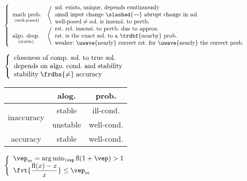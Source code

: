 $
	\left\{
	\begin{array}{ll}
		\underset{\text{(well-posed)}}{\text{math prob.\@}} &
		\left\langle
		\begin{array}{l}
			\text{sol.\@ exists, unique, depends continuously} \\
			\text{small input change } \slashed{\leadsto} \text{ abrupt change in sol.\@} \\
			\text{well-posed} \neq \text{sol.\@ is insensi.\@ to pertb.\@}
		\end{array}
		\right. \\
		\underset{\text{(stable)}}{\text{algo.\@ desp.\@}} &
		\left\langle
		\begin{array}{l}
			\text{rst.\@ rel.\@ insensi.\@ to pertb.\@ due to approx.\@} \\
			\text{rst.\@ is the exact sol.\@ to a \trdbf{nearby} prob.\@} \\
			\text{weaker:\@ \uwave{nearly} correct rst.\@ for \uwave{nearly} the correct prob.\@} \\
		\end{array}
		\right.
	\end{array}
	\right.
$

$
	\left\{
	\begin{array}{l}
		\text{closeness of comp.\@ sol.\@ to true sol.\@} \\
		\text{depends on algo.\@ cond.\@ and stability} \\
		\text{stability} \;\frdbs{\neq}\; \text{accuracy} \\
	\end{array}
	\right.
$
\begin{tabular}{c|c|c}
	~ & alog.\@ & prob.\@ \\
	\hline
	\multirow{2}{*}{inaccuracy} & stable & ill-cond.\@ \\
	& unstable & well-cond.\@ \\
	\hline
	accuracy & stable & well-cond.\@ \\
\end{tabular}

$
	\left\{
	\begin{array}{l}
		\vep_m = \arg\min_\vep \textrm{fl}(1+\vep)>1 \\
		\fvt{\dfrac{\textrm{fl}(x)-x}{x}} \leq \vep_m \\
	\end{array}
	\right.
$


